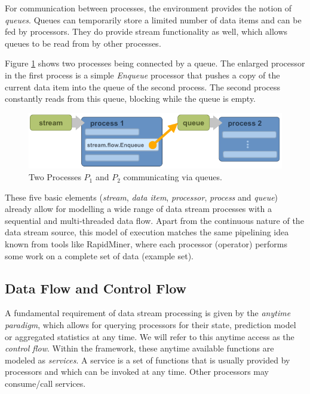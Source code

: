 For communication between processes, the \streams environment provides
the notion of {\em queues}. Queues can temporarily store a limited
number of data items and can be fed by processors. They do provide
stream functionality as well, which allows queues to be read from by
other processes.

Figure \ref{fig:queues} shows two processes being connected by a
queue. The enlarged processor in the first process is a simple {\em
  Enqueue} processor that pushes a copy of the current data item into
the queue of the second process. The second process constantly reads
from this queue, blocking while the queue is empty.

\begin{figure}[h!]
  \begin{center}
    \includegraphics[scale=0.5]{graphics/process-queues.png}
  \end{center}
  \caption{\label{fig:queues}Two Processes $P_1$ and $P_2$ communicating via queues.}
\end{figure}

\bigskip

These five basic elements ({\em stream}, {\em data item}, {\em
  processor}, {\em process} and {\em queue}) already allow for
modelling a wide range of data stream processes with a sequential and
multi-threaded data flow.
Apart from the continuous nature of the data stream source, this model
of execution matches the same pipelining idea known from tools like
RapidMiner, where each processor (operator) performs some work on a
complete set of data (example set).

\subsection{Data Flow and Control Flow}
A fundamental requirement of data stream processing is given by the
{\em anytime paradigm}, which allows for querying processors for their
state, prediction model or aggregated statistics at any time. We will
refer to this anytime access as the {\em control flow}.  Within the
\streams framework, these anytime available functions are modeled as {\em
  services}. A service is a set of functions that is usually provided
by processors and which can be invoked at any time. Other processors
may consume/call services. 


